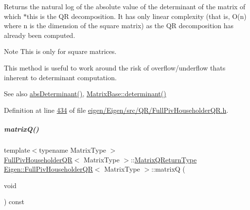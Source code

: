 \begin{DoxyReturn}{Returns}
the natural log of the absolute value of the determinant of the matrix of which $\ast$this is the QR decomposition. It has only linear complexity (that is, O(n) where n is the dimension of the square matrix) as the QR decomposition has already been computed.
\end{DoxyReturn}
\begin{DoxyNote}{Note}
This is only for square matrices.

This method is useful to work around the risk of overflow/underflow that\textquotesingle{}s inherent to determinant computation.
\end{DoxyNote}
\begin{DoxySeeAlso}{See also}
\hyperlink{group___q_r___module_a1029e1ccc70bb8669043c5775e7f3b75}{abs\+Determinant()}, \hyperlink{group___core___module_a7ad8f77004bb956b603bb43fd2e3c061}{Matrix\+Base\+::determinant()} 
\end{DoxySeeAlso}


Definition at line \hyperlink{eigen_2_eigen_2src_2_q_r_2_full_piv_householder_q_r_8h_source_l00434}{434} of file \hyperlink{eigen_2_eigen_2src_2_q_r_2_full_piv_householder_q_r_8h_source}{eigen/\+Eigen/src/\+Q\+R/\+Full\+Piv\+Householder\+Q\+R.\+h}.

\mbox{\label{group___q_r___module_ad26dd2d3c002939771d2375e4e051c28}} 
\subparagraph{\texorpdfstring{matrix\+Q()}{matrixQ()}\hspace{0.1cm}{\footnotesize\ttfamily [1/2]}}
{\footnotesize\ttfamily template$<$typename Matrix\+Type $>$ \\
\hyperlink{group___q_r___module_class_eigen_1_1_full_piv_householder_q_r}{Full\+Piv\+Householder\+QR}$<$ Matrix\+Type $>$\+::\hyperlink{group___q_r___module_struct_eigen_1_1internal_1_1_full_piv_householder_q_r_matrix_q_return_type}{Matrix\+Q\+Return\+Type} \hyperlink{group___q_r___module_class_eigen_1_1_full_piv_householder_q_r}{Eigen\+::\+Full\+Piv\+Householder\+QR}$<$ Matrix\+Type $>$\+::matrixQ (\begin{DoxyParamCaption}\item[{void}]{ }\end{DoxyParamCaption}) const\hspace{0.3cm}{\ttfamily [inline]}}

